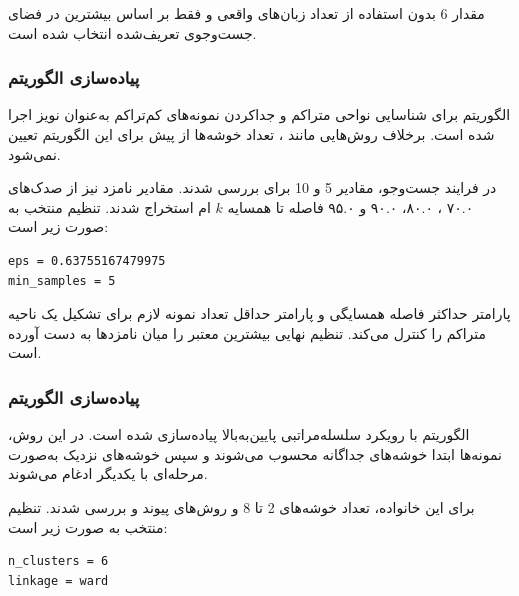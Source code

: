 \documentclass[12pt,a4paper,oneside]{report}
\begin{document}
مقدار 6 بدون استفاده از تعداد زبان‌های واقعی و فقط بر اساس بیشترین
در فضای جست‌وجوی تعریف‌شده انتخاب شده است.


\subsubsection{پیاده‌سازی الگوریتم }

الگوریتم
برای شناسایی نواحی متراکم و جداکردن نمونه‌های کم‌تراکم به‌عنوان نویز اجرا شده است. برخلاف روش‌هایی مانند
،
تعداد خوشه‌ها از پیش برای این الگوریتم تعیین نمی‌شود.

در فرایند جست‌وجو، مقادیر 5 و 10 برای
بررسی شدند. مقادیر نامزد
نیز از صدک‌های ۷۰.۰ ، ۸۰.۰، ۹۰.۰ و ۹۵.۰ فاصله تا همسایه
$k$
ام استخراج شدند. تنظیم منتخب به صورت زیر است:

\begin{latin}
\begin{verbatim}
eps = 0.63755167479975
min_samples = 5
\end{verbatim}
\end{latin}

پارامتر
حداکثر فاصله همسایگی و پارامتر
حداقل تعداد نمونه لازم برای تشکیل یک ناحیه متراکم را کنترل می‌کند. تنظیم نهایی بیشترین
معتبر را میان نامزدها به دست آورده است.


\subsubsection{پیاده‌سازی الگوریتم }

الگوریتم
با رویکرد سلسله‌مراتبی پایین‌به‌بالا پیاده‌سازی شده است. در این روش، نمونه‌ها ابتدا خوشه‌های جداگانه محسوب می‌شوند و سپس خوشه‌های نزدیک به‌صورت مرحله‌ای با یکدیگر ادغام می‌شوند.

برای این خانواده، تعداد خوشه‌های 2 تا 8 و روش‌های پیوند
و
بررسی شدند. تنظیم منتخب به صورت زیر است:

\begin{latin}
\begin{verbatim}
n_clusters = 6
linkage = ward
\end{verbatim}
\end{latin}
\end{document}
